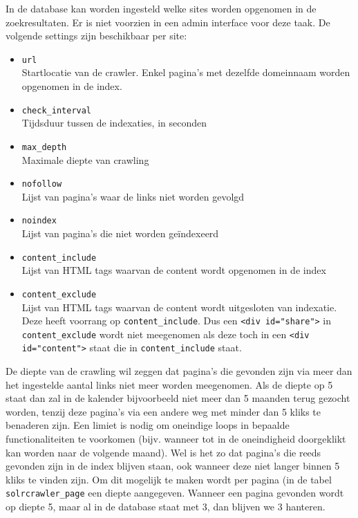 In de database kan worden ingesteld welke sites worden opgenomen in de zoekresultaten. Er is niet voorzien in een admin interface voor deze taak. De volgende settings zijn beschikbaar per site:
\begin{itemize}
\item \texttt{url} \\ Startlocatie van de crawler. Enkel pagina's met dezelfde domeinnaam worden opgenomen in de index.
\item \texttt{check\_interval} \\ Tijdsduur tussen de indexaties, in seconden
\item \texttt{max\_depth} \\ Maximale diepte van crawling
\item \texttt{nofollow} \\ Lijst van pagina's waar de links niet worden gevolgd
\item \texttt{noindex} \\ Lijst van pagina's die niet worden ge\"{i}ndexeerd
\item \texttt{content\_include} \\ Lijst van HTML tags waarvan de content wordt opgenomen in de index
\item \texttt{content\_exclude} \\ Lijst van HTML tags waarvan de content wordt uitgesloten van indexatie. Deze heeft voorrang op \texttt{content\_include}. Dus een \texttt{<div id="share">} in \texttt{content\_exclude} wordt niet meegenomen als deze toch in een \texttt{<div id="content">} staat die in \texttt{content\_include} staat.
\end{itemize}
De diepte van de crawling wil zeggen dat pagina's die gevonden zijn via meer dan het ingestelde aantal links niet meer worden meegenomen. Als de diepte op 5 staat dan zal in de kalender bijvoorbeeld niet meer dan 5 maanden terug gezocht worden, tenzij deze pagina's via een andere weg met minder dan 5 kliks te benaderen zijn. Een limiet is nodig om oneindige loops in bepaalde functionaliteiten te voorkomen (bijv. wanneer tot in de oneindigheid doorgeklikt kan worden naar de volgende maand). Wel is het zo dat pagina's die reeds gevonden zijn in de index blijven staan, ook wanneer deze niet langer binnen 5 kliks te vinden zijn. Om dit mogelijk te maken wordt per pagina (in de tabel \texttt{solrcrawler\_page} een diepte aangegeven. Wanneer een pagina gevonden wordt op diepte 5, maar al in de database staat met 3, dan blijven we 3 hanteren.

